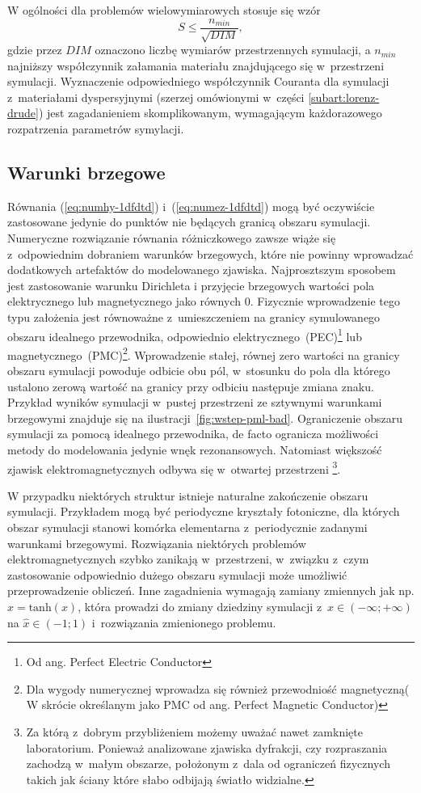 W ogólności dla problemów wielowymiarowych stosuje się wzór
\begin{equation}
S\le\frac{n_{min}}{\sqrt{DIM}},
\label{eq:courant}
\end{equation}
gdzie przez $DIM$ oznaczono liczbę wymiarów przestrzennych symulacji, a $n_{min}$ najniższy współczynnik załamania materiału znajdującego się w~przestrzeni symulacji. Wyznaczenie odpowiedniego współczynnik Couranta dla symulacji z~materiałami dyspersyjnymi (szerzej omówionymi w~części \ref{subart:lorenz-drude}) jest zagadanieniem skomplikowanym, wymagającym każdorazowego rozpatrzenia parametrów symylacji.

\subsection{Warunki brzegowe}
Równania (\ref{eq:numhy-1dfdtd}) i~(\ref{eq:numez-1dfdtd}) mogą być oczywiście zastosowane jedynie do punktów nie będących granicą obszaru symulacji. Numeryczne rozwiązanie równania różniczkowego zawsze wiąże się z~odpowiednim dobraniem warunków brzegowych, które nie powinny wprowadzać dodatkowych artefaktów do modelowanego zjawiska. Najprosztszym sposobem jest zastosowanie warunku Dirichleta i przyjęcie brzegowych wartości pola elektrycznego lub magnetycznego jako równych 0. Fizycznie wprowadzenie tego typu założenia jest równoważne z~umieszczeniem na granicy symulowanego obszaru idealnego przewodnika, odpowiednio elektrycznego~(PEC)\footnote{Od ang. Perfect Electric Conductor} lub magnetycznego~(PMC)\footnote{Dla wygody numerycznej wprowadza się również przewodniość magnetyczną( W skrócie określanym jako PMC od ang. Perfect Magnetic Conductor)}. Wprowadzenie stałej, równej zero wartości na granicy obszaru symulacji powoduje odbicie obu pól, w~stosunku do pola dla którego ustalono zerową wartość na granicy przy odbiciu następuje zmiana znaku. Przykład wyników symulacji w~pustej przestrzeni ze sztywnymi warunkami brzegowymi znajduje się na ilustracji~\ref{fig:wstep-pml-bad}. Ograniczenie obszaru symulacji za pomocą idealnego przewodnika, de facto ogranicza możliwości metody do modelowania jedynie wnęk rezonansowych. Natomiast większość zjawisk elektromagnetycznych odbywa się w~otwartej przestrzeni \footnote{Za którą z~dobrym przybliżeniem możemy uważać nawet zamknięte laboratorium. Ponieważ analizowane zjawiska dyfrakcji, czy rozpraszania zachodzą w~małym obszarze, położonym z~dala od ograniczeń fizycznych takich jak ściany które słabo odbijają światło widzialne.}.

W przypadku niektórych struktur istnieje naturalne zakończenie obszaru symulacji. Przykładem mogą być periodyczne kryształy fotoniczne, dla których obszar symulacji stanowi komórka elementarna z~periodycznie zadanymi warunkami brzegowymi. Rozwiązania niektórych problemów elektromagnetycznych szybko zanikają w~przestrzeni, w~związku z~czym zastosowanie odpowiednio dużego obszaru symulacji może umożliwić przeprowadzenie obliczeń. Inne zagadnienia wymagają zamiany zmiennych  jak np. $\hat{x}=\textrm{tanh}(x)$, która prowadzi do zmiany dziedziny symulacji z~$x\in(- \infty; + \infty)$ na $\hat{x}\in(-1;1)$ i~rozwiązania zmienionego problemu. 

